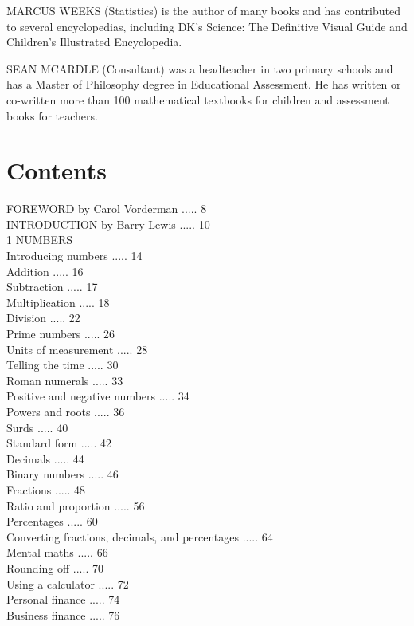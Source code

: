 \documentclass[10pt]{article}
\begin{document}
MARCUS WEEKS (Statistics) is the author of many books and has contributed to several encyclopedias, including DK's Science: The Definitive Visual Guide and Children's Illustrated Encyclopedia.

SEAN MCARDLE (Consultant) was a headteacher in two primary schools and has a Master of Philosophy degree in Educational Assessment. He has written or co-written more than 100 mathematical textbooks for children and assessment books for teachers.

\section*{Contents}
FOREWORD by Carol Vorderman ..... 8\\
INTRODUCTION by Barry Lewis ..... 10\\
1 NUMBERS\\
Introducing numbers ..... 14\\
Addition ..... 16\\
Subtraction ..... 17\\
Multiplication ..... 18\\
Division ..... 22\\
Prime numbers ..... 26\\
Units of measurement ..... 28\\
Telling the time ..... 30\\
Roman numerals ..... 33\\
Positive and negative numbers ..... 34\\
Powers and roots ..... 36\\
Surds ..... 40\\
Standard form ..... 42\\
Decimals ..... 44\\
Binary numbers ..... 46\\
Fractions ..... 48\\
Ratio and proportion ..... 56\\
Percentages ..... 60\\
Converting fractions, decimals, and percentages ..... 64\\
Mental maths ..... 66\\
Rounding off ..... 70\\
Using a calculator ..... 72\\
Personal finance ..... 74\\
Business finance ..... 76
\end{document}
